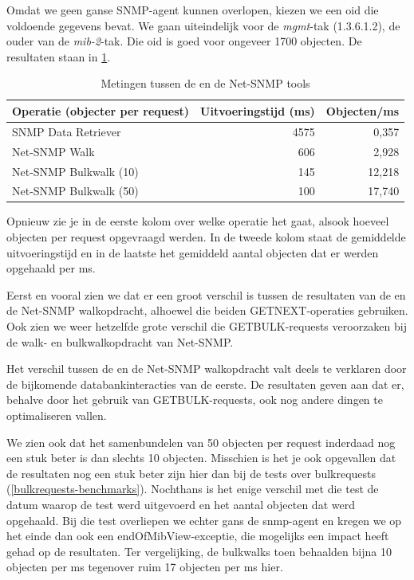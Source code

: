 Omdat we geen ganse SNMP-agent kunnen overlopen, kiezen we een \gls{oid} die voldoende gegevens bevat.
We gaan uiteindelijk voor de \textit{mgmt}-tak (1.3.6.1.2), de ouder van de \textit{mib-2}-tak.
Die \gls{oid} is goed voor ongeveer 1700 objecten.
De resultaten staan in \cref{tabel-nwmretriever-vs-net-snmp}.

\begin{table}[h]
\centering
\begin{tabular}{@{}lrr@{}}
\toprule
Operatie (objecter per request) & Uitvoeringstijd (ms) & Objecten/ms \\ \midrule
SNMP Data Retriever             & 4575                 & 0,357       \\
Net-SNMP Walk                   & 606                  & 2,928       \\
Net-SNMP Bulkwalk (10)          & 145                  & 12,218      \\
Net-SNMP Bulkwalk (50)          & 100                  & 17,740      \\ \bottomrule
\end{tabular}
\caption{Metingen tussen de \nwmretriever{} en de Net-SNMP tools}
\label{tabel-nwmretriever-vs-net-snmp}
\end{table}

Opnieuw zie je in de eerste kolom over welke operatie het gaat, alsook hoeveel objecten per request opgevraagd werden.
In de tweede kolom staat de gemiddelde uitvoeringstijd en in de laatste het gemiddeld aantal objecten dat er werden opgehaald per ms.

Eerst en vooral zien we dat er een groot verschil is tussen de resultaten van de \nwmretriever{}
en de Net-SNMP walkopdracht, alhoewel die beiden GETNEXT-operaties gebruiken.
Ook zien we weer hetzelfde grote verschil die GETBULK-requests veroorzaken bij de walk- en bulkwalkopdracht van Net-SNMP.

Het verschil tussen de \nwmretriever{} en de Net-SNMP walkopdracht valt deels te verklaren door de bijkomende databankinteracties van de eerste.
De resultaten geven aan dat er, behalve door het gebruik van GETBULK-requests, ook nog andere dingen te optimaliseren vallen.

We zien ook dat het samenbundelen van 50 objecten per request inderdaad nog een stuk beter is dan slechts 10 objecten.
Misschien is het je ook opgevallen dat de resultaten nog een stuk beter zijn hier dan bij de tests over bulkrequests (\cref{bulkrequests-benchmarks}).
Nochthans is het enige verschil met die test de datum waarop de test werd uitgevoerd en het aantal objecten dat werd opgehaald.
Bij die test overliepen we echter gans de \gls{snmp-agent} en kregen we op het einde dan ook een endOfMibView-exceptie,
die mogelijks een impact heeft gehad op de resultaten.
Ter vergelijking, de bulkwalks toen behaalden bijna 10 objecten per ms tegenover ruim 17 objecten per ms hier.

